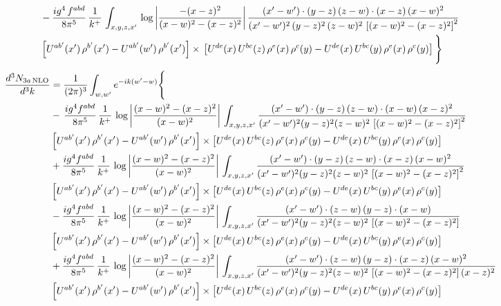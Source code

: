 \documentclass[9pt]{article}
\numberwithin{equation}{section}
\begin{document}
\begin{align}
& -\frac{ig^{4}\, f^{abd}}{8\pi^{5}}\, \frac{1}{k^{+}}\, \int_{x,y,z,x'}\,\log{\left|\frac{-(x-z)^{2}}{(x-w)^{2}-(x-z)^{2}}\right|}\,\frac{(x'-w')\cdot (y-z)\, (z-w)\cdot (x-z)\,(x-w)^{2}}{(x'-w')^{2}\, (y-z)^{2}\, (z-w)^{2}\,\left[(x-w)^{2}-(x-z)^{2}\right]^{2}}\, \notag \\ & \left[U^{ab'}(x')\,\rho^{b'}(x')-U^{ab'}(w')\, \rho^{b'}(x')\right]\times\,\left[U^{de}(x)\,U^{bc}(z)\, \rho^{e}(x)\,\rho^{c}(y)-U^{de}(x)\,U^{bc}(y)\,\rho^{e}(x)\,\rho^{c}(y)\right]\Bigg\}
\end{align}
\begin{align}
\frac{d^{3}N_{3a\,\rm NLO}}{d^{3}k} & = \frac{1}{(2\pi)^{3}}\int_{w,w'}e^{-ik(w'-w)}\Bigg\{\notag \\
& -\,\frac{ig^{4}f^{abd}}{8\pi^{5}}\,\frac{1}{k^{+}}\,\log{\left|\frac{(x-w)^{2}-(x-z)^{2}}{(x-w)^{2}}\right|}\,\int_{x,y,z,x'}
\frac{(x'-w')\cdot(y-z)\,(z-w)\cdot(x-w)\,(x-z)^{2}}{(x'-w')^{2}(y-z)^{2}(z-w)^{2}\,\left[(x-w)^{2}-(x-z)^{2}\right]^{2}}\notag \\ & \left[U^{ab'}(x')\,\rho^{b'}(x')-U^{ab'}(w')\, \rho^{b'}(x')\right]\times \left[U^{de}(x)\,U^{bc}(z)\, \rho^{e}(x)\,\rho^{c}(y)-U^{de}(x)\,U^{bc}(y)\,\rho^{e}(x)\,\rho^{c}(y)\right] \notag \\
& +\frac{ig^{4}f^{abd}}{8\pi^{5}}\,\frac{1}{k^{+}}\,\log{\left|\frac{(x-w)^{2}-(x-z)^{2}}{(x-w)^{2}}\right|}\,\int_{x,y,z,x'}
\frac{(x'-w')\cdot(y-z)\,(z-w)\cdot(x-z)\,(x-w)^{2}}{(x'-w')^{2}(y-z)^{2}(z-w)^{2}\,\left[(x-w)^{2}-(x-z)^{2}\right]^{2}}\notag \\ 
&\left[U^{ab'}(x')\,\rho^{b'}(x')-U^{ab'}(w')\, \rho^{b'}(x')\right]\times \left[U^{de}(x)\,U^{bc}(z)\, \rho^{e}(x)\,\rho^{c}(y)-U^{de}(x)\,U^{bc}(y)\,\rho^{e}(x)\,\rho^{c}(y)\right] \notag \\
& -\frac{ig^{4}f^{abd}}{8\pi^{5}}\,\frac{1}{k^{+}}\,\log{\left|\frac{(x-w)^{2}-(x-z)^{2}}{(x-w)^{2}}\right|}\,\int_{x,y,z,x'}
\frac{(x'-w')\cdot(z-w)\,(y-z)\cdot(x-w)}{(x'-w')^{2}(y-z)^{2}(z-w)^{2}\,\left[(x-w)^{2}-(x-z)^{2}\right]}\notag \\ & \left[U^{ab'}(x')\,\rho^{b'}(x')-U^{ab'}(w')\, \rho^{b'}(x')\right]\times \left[U^{de}(x)\,U^{bc}(z)\, \rho^{e}(x)\,\rho^{c}(y)-U^{de}(x)\,U^{bc}(y)\,\rho^{e}(x)\,\rho^{c}(y)\right] \notag \\
&  +\frac{ig^{4}f^{abd}}{8\pi^{5}}\,\frac{1}{k^{+}}\,\log{\left|\frac{(x-w)^{2}-(x-z)^{2}}{(x-w)^{2}}\right|}\,\int_{x,y,z,x'}
\frac{(x'-w')\cdot(z-w)\,(y-z)\cdot(x-z)\,(x-w)^{2}}{(x'-w')^{2}(y-z)^{2}(z-w)^{2}\,\left[(x-w)^{2}-(x-z)^{2}\right](x-z)^{2}}\notag \\ & \left[U^{ab'}(x')\,\rho^{b'}(x')-U^{ab'}(w')\, \rho^{b'}(x')\right]\times \left[U^{de}(x)\,U^{bc}(z)\, \rho^{e}(x)\,\rho^{c}(y)-U^{de}(x)\,U^{bc}(y)\,\rho^{e}(x)\,\rho^{c}(y)\right] \notag \\

\end{align}
\end{document}
